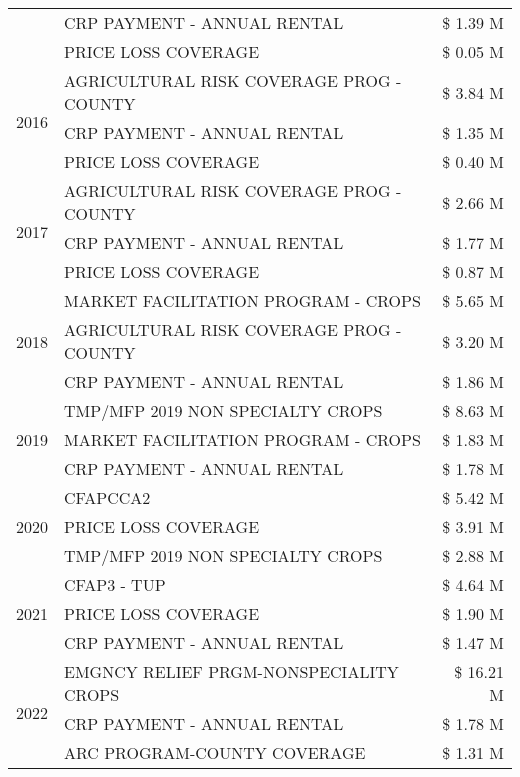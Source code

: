 \begin{tabular}{llr}
 & CRP PAYMENT - ANNUAL RENTAL & \$ 1.39 M \\
 & PRICE LOSS COVERAGE & \$ 0.05 M \\
\cline{1-3}
\multirow[t]{3}{*}{2016} & AGRICULTURAL RISK COVERAGE PROG - COUNTY & \$ 3.84 M \\
 & CRP PAYMENT - ANNUAL RENTAL & \$ 1.35 M \\
 & PRICE LOSS COVERAGE & \$ 0.40 M \\
\cline{1-3}
\multirow[t]{3}{*}{2017} & AGRICULTURAL RISK COVERAGE PROG - COUNTY & \$ 2.66 M \\
 & CRP PAYMENT - ANNUAL RENTAL & \$ 1.77 M \\
 & PRICE LOSS COVERAGE & \$ 0.87 M \\
\cline{1-3}
\multirow[t]{3}{*}{2018} & MARKET FACILITATION PROGRAM - CROPS & \$ 5.65 M \\
 & AGRICULTURAL RISK COVERAGE PROG - COUNTY & \$ 3.20 M \\
 & CRP PAYMENT - ANNUAL RENTAL & \$ 1.86 M \\
\cline{1-3}
\multirow[t]{3}{*}{2019} & TMP/MFP 2019 NON SPECIALTY CROPS & \$ 8.63 M \\
 & MARKET FACILITATION PROGRAM - CROPS & \$ 1.83 M \\
 & CRP PAYMENT - ANNUAL RENTAL & \$ 1.78 M \\
\cline{1-3}
\multirow[t]{3}{*}{2020} & CFAPCCA2 & \$ 5.42 M \\
 & PRICE LOSS COVERAGE & \$ 3.91 M \\
 & TMP/MFP 2019 NON SPECIALTY CROPS & \$ 2.88 M \\
\cline{1-3}
\multirow[t]{3}{*}{2021} & CFAP3 - TUP & \$ 4.64 M \\
 & PRICE LOSS COVERAGE & \$ 1.90 M \\
 & CRP PAYMENT - ANNUAL RENTAL & \$ 1.47 M \\
\cline{1-3}
\multirow[t]{3}{*}{2022} & EMGNCY RELIEF PRGM-NONSPECIALITY CROPS & \$ 16.21 M \\
 & CRP PAYMENT - ANNUAL RENTAL & \$ 1.78 M \\
 & ARC PROGRAM-COUNTY COVERAGE & \$ 1.31 M \\
\cline{1-3}
\bottomrule
\end{tabular}
